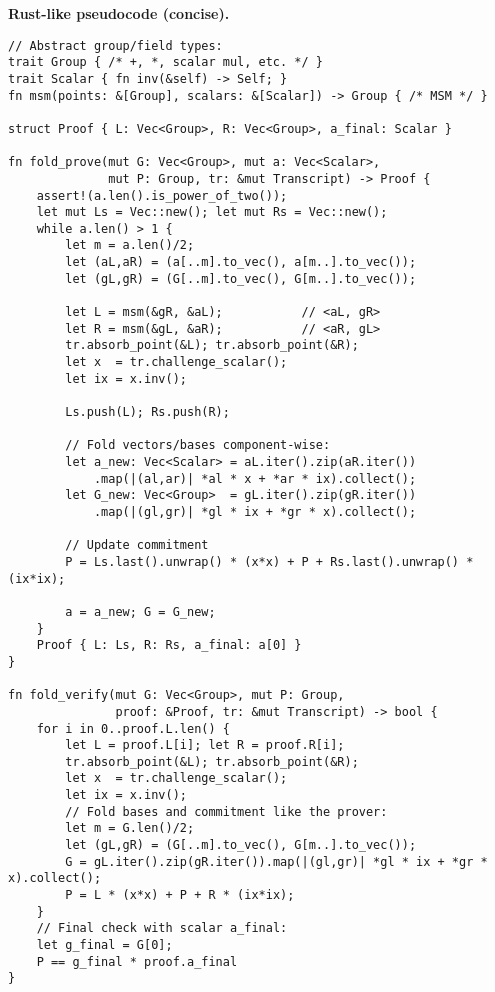 \documentclass[11pt,a4paper]{article}
\begin{document}
\medskip
\textbf{Rust-like pseudocode (concise).}
\begin{verbatim}
// Abstract group/field types:
trait Group { /* +, *, scalar mul, etc. */ }
trait Scalar { fn inv(&self) -> Self; }
fn msm(points: &[Group], scalars: &[Scalar]) -> Group { /* MSM */ }

struct Proof { L: Vec<Group>, R: Vec<Group>, a_final: Scalar }

fn fold_prove(mut G: Vec<Group>, mut a: Vec<Scalar>,
              mut P: Group, tr: &mut Transcript) -> Proof {
    assert!(a.len().is_power_of_two());
    let mut Ls = Vec::new(); let mut Rs = Vec::new();
    while a.len() > 1 {
        let m = a.len()/2;
        let (aL,aR) = (a[..m].to_vec(), a[m..].to_vec());
        let (gL,gR) = (G[..m].to_vec(), G[m..].to_vec());

        let L = msm(&gR, &aL);           // <aL, gR>
        let R = msm(&gL, &aR);           // <aR, gL>
        tr.absorb_point(&L); tr.absorb_point(&R);
        let x  = tr.challenge_scalar();
        let ix = x.inv();

        Ls.push(L); Rs.push(R);

        // Fold vectors/bases component-wise:
        let a_new: Vec<Scalar> = aL.iter().zip(aR.iter())
            .map(|(al,ar)| *al * x + *ar * ix).collect();
        let G_new: Vec<Group>  = gL.iter().zip(gR.iter())
            .map(|(gl,gr)| *gl * ix + *gr * x).collect();

        // Update commitment
        P = Ls.last().unwrap() * (x*x) + P + Rs.last().unwrap() * (ix*ix);

        a = a_new; G = G_new;
    }
    Proof { L: Ls, R: Rs, a_final: a[0] }
}

fn fold_verify(mut G: Vec<Group>, mut P: Group,
               proof: &Proof, tr: &mut Transcript) -> bool {
    for i in 0..proof.L.len() {
        let L = proof.L[i]; let R = proof.R[i];
        tr.absorb_point(&L); tr.absorb_point(&R);
        let x  = tr.challenge_scalar();
        let ix = x.inv();
        // Fold bases and commitment like the prover:
        let m = G.len()/2;
        let (gL,gR) = (G[..m].to_vec(), G[m..].to_vec());
        G = gL.iter().zip(gR.iter()).map(|(gl,gr)| *gl * ix + *gr * x).collect();
        P = L * (x*x) + P + R * (ix*ix);
    }
    // Final check with scalar a_final:
    let g_final = G[0];
    P == g_final * proof.a_final
}
\end{verbatim}
\end{document}
